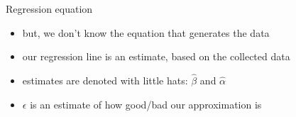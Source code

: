 \documentclass[presentation]{beamer}
\begin{document}
\begin{frame}[label={sec:orgcd77a35}]{Regression equation}
\begin{itemize}
\item but, we don't know the equation that generates the data
\item our regression line is an estimate, based on the collected data
\end{itemize}

\pause

\begin{itemize}
\item estimates are denoted with little hats: \(\hat{\beta}\) and \(\hat{\alpha}\)
\end{itemize}

\pause

\begin{itemize}
\item \(\epsilon\) is an estimate of how good/bad our approximation is
\end{itemize}
\end{frame}
\end{document}
